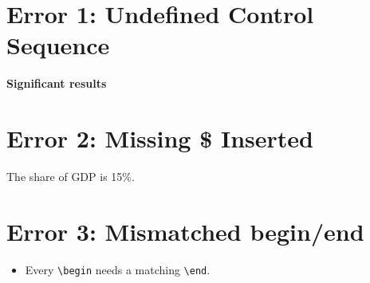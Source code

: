 \documentclass[11pt,a4paper]{article}
\begin{document}
\section*{Error 1: Undefined Control Sequence}
\textbf{Significant results}

\section*{Error 2: Missing \$ Inserted}
The share of GDP is 15\%.

\section*{Error 3: Mismatched begin/end}
\begin{itemize}
  \item Every \verb|\begin| needs a matching \verb|\end|.
\end{itemize}
\end{document}
